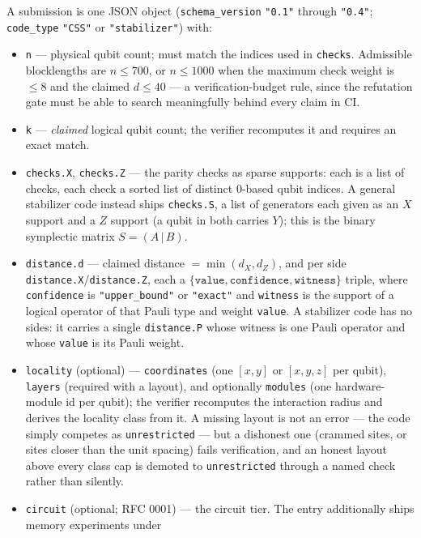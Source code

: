 \documentclass[11pt]{article}
\begin{document}
	A submission is one JSON object (\texttt{schema\_version} \texttt{"0.1"}
	through \texttt{"0.4"}; \texttt{code\_type} \texttt{"CSS"} or
	\texttt{"stabilizer"}) with:
	\begin{itemize}[nosep]
		\item \texttt{n} --- physical qubit count; must match the indices used
		in \texttt{checks}. Admissible blocklengths are $n\le 700$, or
		$n\le 1000$ when the maximum check weight is $\le 8$ and the claimed
		$d\le 40$ --- a verification-budget rule, since the refutation gate
		must be able to search meaningfully behind every claim in CI.
		\item \texttt{k} --- \emph{claimed} logical qubit count; the verifier
		recomputes it and requires an exact match.
		\item \texttt{checks.X}, \texttt{checks.Z} --- the parity checks as
		sparse supports: each is a list of checks, each check a sorted list of
		distinct $0$-based qubit indices. A general stabilizer code instead
		ships \texttt{checks.S}, a list of generators each given as an $X$
		support and a $Z$ support (a qubit in both carries $Y$); this is the
		binary symplectic matrix $S=(A\,|\,B)$.
		\item \texttt{distance.d} --- claimed distance $=\min(d_X,d_Z)$, and
		per side \texttt{distance.X}/\texttt{distance.Z}, each a
		$\{\texttt{value},\texttt{confidence},\texttt{witness}\}$ triple,
		where \texttt{confidence} is \texttt{"upper\_bound"} or
		\texttt{"exact"} and \texttt{witness} is the support of a logical
		operator of that Pauli type and weight \texttt{value}. A stabilizer
		code has no sides: it carries a single \texttt{distance.P} whose
		witness is one Pauli operator and whose \texttt{value} is its Pauli
		weight.
		\item \texttt{locality} (optional) --- \texttt{coordinates} (one
		$[x,y]$ or $[x,y,z]$ per qubit), \texttt{layers} (required with a
		layout), and optionally \texttt{modules} (one hardware-module id per
		qubit); the verifier recomputes the interaction radius and derives
		the locality class from it. A missing layout is not an error --- the
		code simply competes as \texttt{unrestricted} --- but a dishonest one
		(crammed sites, or sites closer than the unit spacing) fails
		verification, and an honest layout above every class cap is demoted
		to \texttt{unrestricted} through a named check rather than silently.
		\item \texttt{circuit} (optional; RFC 0001) --- the circuit tier. The
		entry additionally ships memory experiments under

\end{itemize}
\end{document}
